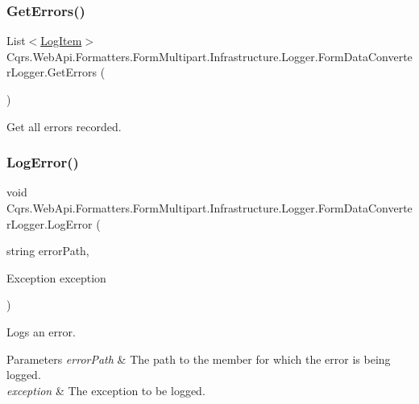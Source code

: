 \subsubsection{\texorpdfstring{Get\+Errors()}{GetErrors()}}
{\footnotesize\ttfamily List$<$\hyperlink{classCqrs_1_1WebApi_1_1Formatters_1_1FormMultipart_1_1Infrastructure_1_1Logger_1_1FormDataConverterLogger_1_1LogItem}{Log\+Item}$>$ Cqrs.\+Web\+Api.\+Formatters.\+Form\+Multipart.\+Infrastructure.\+Logger.\+Form\+Data\+Converter\+Logger.\+Get\+Errors (\begin{DoxyParamCaption}{ }\end{DoxyParamCaption})}



Get all errors recorded. 

\mbox{\label{classCqrs_1_1WebApi_1_1Formatters_1_1FormMultipart_1_1Infrastructure_1_1Logger_1_1FormDataConverterLogger_ab54b4f24cc7ee7eacddbb9900a832ca3_ab54b4f24cc7ee7eacddbb9900a832ca3}} 
\subsubsection{\texorpdfstring{Log\+Error()}{LogError()}\hspace{0.1cm}{\footnotesize\ttfamily [1/2]}}
{\footnotesize\ttfamily void Cqrs.\+Web\+Api.\+Formatters.\+Form\+Multipart.\+Infrastructure.\+Logger.\+Form\+Data\+Converter\+Logger.\+Log\+Error (\begin{DoxyParamCaption}\item[{string}]{error\+Path,  }\item[{Exception}]{exception }\end{DoxyParamCaption})}



Logs an error. 


\begin{DoxyParams}{Parameters}
{\em error\+Path} & The path to the member for which the error is being logged.\\
\hline
{\em exception} & The exception to be logged.\\
\hline
\end{DoxyParams}


